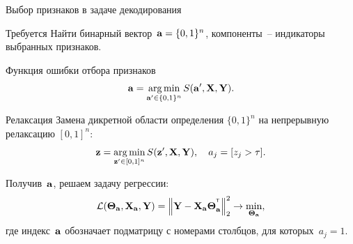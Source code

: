 \documentclass[10pt]{beamer}
\begin{document}
\begin{frame}{Выбор признаков в задаче декодирования}
\begin{block}{Требуется}
Найти бинарный вектор~$\mathbf{a} = \{0, 1\}^n$, компоненты~-- индикаторы выбранных признаков. 
\end{block}
\begin{block}{Функция ошибки отбора признаков}
	\vspace{-0.2cm}
\[
\mathbf{a} = \mathop{\arg \min}\limits_{\mathbf{a}' \in \{0, 1\}^n} S(\mathbf{a}', \mathbf{X}, \mathbf{Y}).
\]
\vspace{-0.5cm}
\end{block}
\begin{block}{Релаксация}
	Замена дикретной области определения $\{0, 1\}^n$ на непрерывную релаксацию $[0, 1]^n$:
	\[
	\mathbf{z} = \mathop{\arg \min}\limits_{\mathbf{z}' \in [0, 1]^n} S(\mathbf{z}', \mathbf{X}, \mathbf{Y}), \quad 
	a_j = [z_j > \tau].
\]
\end{block}
Получив~$\mathbf{a}$, решаем задачу регрессии:
\[
\mathcal{L}(\boldsymbol{\Theta}_{\mathbf{a}}, \mathbf{X}_{\mathbf{a}}, \mathbf{Y}) = {\left\| \mathbf{Y} - \mathbf{X}_{\mathbf{a}}\boldsymbol{\Theta}^{^{\text{\tiny\sffamily\upshape\mdseries T}}}_{\mathbf{a}} \right\| }_2^2 \rightarrow\min_{\boldsymbol{\Theta}_{\mathbf{a}}},
\]
где индекс~$\mathbf{a}$ обозначает подматрицу с номерами столбцов, для которых~$a_j = 1$.
\end{frame}
\end{document}
